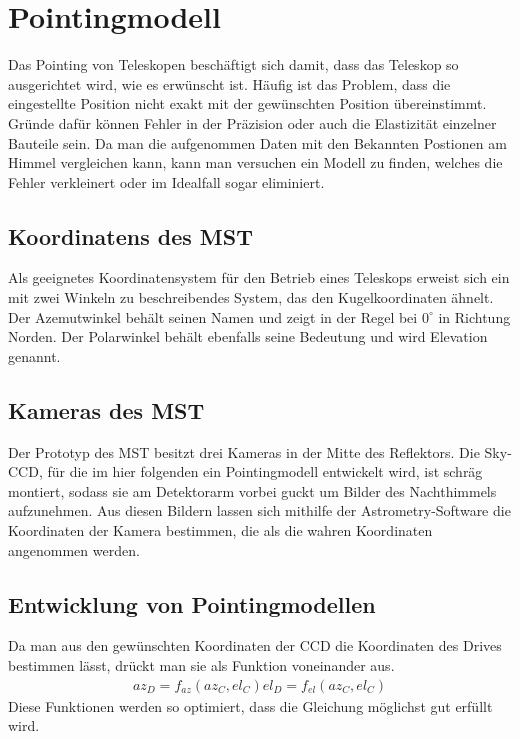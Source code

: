 \chapter{Pointingmodell}
Das Pointing von Teleskopen beschäftigt sich damit, dass das Teleskop so ausgerichtet wird, wie es erwünscht ist. Häufig ist das Problem, dass die eingestellte Position nicht exakt mit der gewünschten Position übereinstimmt. Gründe dafür können Fehler in der Präzision oder auch die Elastizität einzelner Bauteile sein. Da man die aufgenommen Daten mit den Bekannten Postionen am Himmel vergleichen kann, kann man versuchen ein Modell zu finden, welches die Fehler verkleinert oder im Idealfall sogar eliminiert.

\section{Koordinatens des MST}
Als geeignetes Koordinatensystem für den Betrieb eines Teleskops erweist sich ein mit zwei Winkeln zu beschreibendes System, das den Kugelkoordinaten ähnelt. Der Azemutwinkel behält seinen Namen und zeigt in der Regel bei $0^\circ$ in Richtung Norden. Der Polarwinkel behält ebenfalls seine Bedeutung und wird Elevation genannt.

\section{Kameras des MST}
Der Prototyp des MST besitzt drei Kameras in der Mitte des Reflektors. Die Sky-CCD, für die im hier folgenden ein Pointingmodell entwickelt wird, ist schräg montiert, sodass sie am Detektorarm vorbei guckt um Bilder des Nachthimmels aufzunehmen. Aus diesen Bildern lassen sich mithilfe der Astrometry-Software die Koordinaten der Kamera bestimmen, die als die wahren Koordinaten angenommen werden.

\section{Entwicklung von Pointingmodellen}
Da man aus den gewünschten Koordinaten der CCD die Koordinaten des Drives bestimmen lässt, drückt man sie als Funktion voneinander aus.
\begin{align}
az_D=f_{az}(az_C,el_C)
el_D=f_{el}(az_C,el_C)
\label{eq:pointingprinciple}
\end{align}
Diese Funktionen werden so optimiert, dass die Gleichung möglichst gut erfüllt wird.

